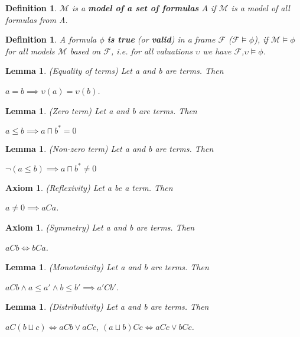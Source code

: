\documentclass{article}
\newcommand\M{\mathcal{M}}
\newcommand\F{\mathcal{F}}
\newtheorem{lemma}[theorem]{Lemma}
\newtheorem{axiom}[theorem]{Axiom}
\newtheorem{defn}[theorem]{Definition}
\begin{document}
	\begin{defn}
		$\M$ is a \textbf{model of a set of formulas} $A$ if $\M$ is a model of all formulas from A.
	\end{defn}

	\begin{defn} A formula $\phi$ \textbf{is \textit{true}} (or \textbf{valid}) in a frame $\F$ ($\F \models \phi$), if $\M \models \phi$ for all models $\M$ based on $\F$, i.e. for all valuations $\upsilon$ we have $\F$,$\upsilon \models \phi$.
	\end{defn}

	\begin{lemma}
		(Equality of terms) Let a and b are terms. Then \par $a = b \implies \upsilon(a) = \upsilon(b)$.
	\end{lemma}

	\begin{lemma} (Zero term) Let a and b are terms. Then \par $a \leq b \implies a \sqcap b^*=0$
	\end{lemma}

	\begin{lemma} (Non-zero term) Let a and b are terms. Then \par $\neg(a \leq b) \implies a \sqcap b^* \neq 0$
	\end{lemma}

	\begin{axiom}
		(Reflexivity) Let a be a term. Then \par $ a \neq 0 \implies aCa$.
	\end{axiom}

	\begin{axiom}
		(Symmetry) Let a and b are terms. Then \par $aCb \iff bCa$.
	\end{axiom}

	\begin{lemma}
		(Monotonicity) Let a and b are terms. Then \par $aCb \land a \leq a' \land b \leq b' \implies a'Cb'$.
	\end{lemma}

	\begin{lemma}
		(Distributivity) Let a and b are terms. Then \par $aC(b \sqcup c) \iff aCb \lor aCc$, \; $(a \sqcup b)Cc \iff aCc \lor bCc$.
	\end{lemma}
\end{document}

